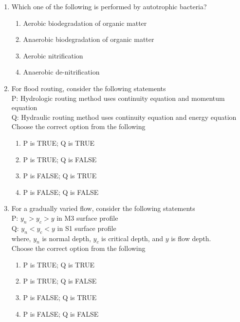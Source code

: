 \documentclass[journal]{IEEEtran}
\begin{document}
\begin{enumerate}[resume]
\item Which one of the following is performed by autotrophic bacteria?
\hfill{}
\begin{enumerate}
\item Aerobic biodegradation of organic matter
\item Anaerobic biodegradation of organic matter
\item Aerobic nitrification
\item Anaerobic de-nitrification
\end{enumerate}

\item For flood routing, consider the following statements \\
P: Hydrologic routing method uses continuity equation and momentum equation \\
Q: Hydraulic routing method uses continuity equation and energy equation \\
Choose the correct option from the following
\hfill{}
\begin{enumerate}
\item P is TRUE; Q is TRUE
\item P is TRUE; Q is FALSE
\item P is FALSE; Q is TRUE
\item P is FALSE; Q is FALSE
\end{enumerate}

\item For a gradually varied flow, consider the following statements \\
P: $y_n > y_c > y$ in M3 surface profile \\
Q: $y_n < y_c < y$ in S1 surface profile \\
where, $y_n$ is normal depth, $y_c$ is critical depth, and $y$ is flow depth. \\
Choose the correct option from the following
\hfill{}
\begin{enumerate}
\item P is TRUE; Q is TRUE
\item P is TRUE; Q is FALSE
\item P is FALSE; Q is TRUE
\item P is FALSE; Q is FALSE
\end{enumerate}


\end{enumerate}
\end{document}
